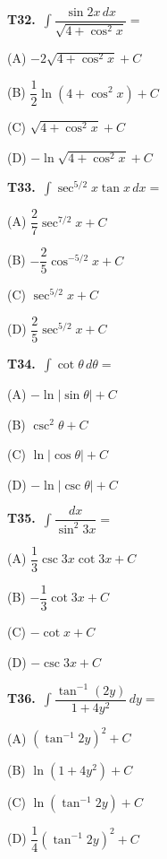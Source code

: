 \documentclass[11pt]{article}
\begin{document}
\bigskip\noindent\textbf{T32.}\ $\displaystyle\int \dfrac{\sin 2x\,dx}{\sqrt{4+\cos^2 x}} =$
\begin{list}{}{\setlength{\leftmargin}{3em}\setlength{\labelwidth}{2.5em}\setlength{\itemsep}{0pt}\setlength{\topsep}{2pt}}
\item[(A)] $-2\sqrt{4+\cos^2x}+C$
\item[(B)] $\dfrac{1}{2}\ln(4+\cos^2x)+C$
\item[(C)] $\sqrt{4+\cos^2x}+C$
\item[(D)] $-\ln\sqrt{4+\cos^2x}+C$
\end{list}

\bigskip\noindent\textbf{T33.}\ $\displaystyle\int \sec^{5/2}x\tan x\,dx =$
\begin{list}{}{\setlength{\leftmargin}{3em}\setlength{\labelwidth}{2.5em}\setlength{\itemsep}{0pt}\setlength{\topsep}{2pt}}
\item[(A)] $\dfrac{2}{7}\sec^{7/2}x+C$
\item[(B)] $-\dfrac{2}{5}\cos^{-5/2}x+C$
\item[(C)] $\sec^{5/2}x+C$
\item[(D)] $\dfrac{2}{5}\sec^{5/2}x+C$
\end{list}

\bigskip\noindent\textbf{T34.}\ $\displaystyle\int \cot\theta\,d\theta =$
\begin{list}{}{\setlength{\leftmargin}{3em}\setlength{\labelwidth}{2.5em}\setlength{\itemsep}{0pt}\setlength{\topsep}{2pt}}
\item[(A)] $-\ln|\sin\theta|+C$
\item[(B)] $\csc^2\theta+C$
\item[(C)] $\ln|\cos\theta|+C$
\item[(D)] $-\ln|\csc\theta|+C$
\end{list}

\bigskip\noindent\textbf{T35.}\ $\displaystyle\int \dfrac{dx}{\sin^2 3x} =$
\begin{list}{}{\setlength{\leftmargin}{3em}\setlength{\labelwidth}{2.5em}\setlength{\itemsep}{0pt}\setlength{\topsep}{2pt}}
\item[(A)] $\dfrac{1}{3}\csc 3x\cot 3x+C$
\item[(B)] $-\dfrac{1}{3}\cot 3x+C$
\item[(C)] $-\cot x+C$
\item[(D)] $-\csc 3x+C$
\end{list}

\bigskip\noindent\textbf{T36.}\ $\displaystyle\int \dfrac{\tan^{-1}(2y)}{1+4y^2}\,dy =$
\begin{list}{}{\setlength{\leftmargin}{3em}\setlength{\labelwidth}{2.5em}\setlength{\itemsep}{0pt}\setlength{\topsep}{2pt}}
\item[(A)] $(\tan^{-1}2y)^2+C$
\item[(B)] $\ln(1+4y^2)+C$
\item[(C)] $\ln(\tan^{-1}2y)+C$
\item[(D)] $\dfrac{1}{4}(\tan^{-1}2y)^2+C$
\end{list}
\end{document}
